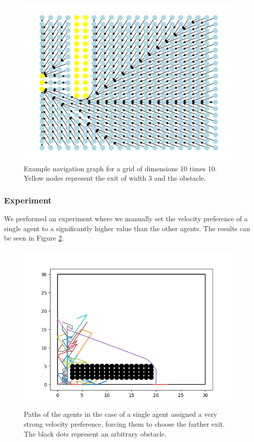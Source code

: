 \documentclass[9pt]{pnas-new}
\begin{document}
\begin{figure}[h!]
    \centering
    \includegraphics[width=0.5\linewidth]{fig/dijkstra.png}
    \caption{Example navigation graph for a grid of dimensions 10 times 10. Yellow nodes represent the exit of width 3 and the obstacle.}
    \label{fig:spgraph}
\end{figure}



\subsubsection{Experiment}
We performed an experiment where we manually set the velocity preference of a single agent to a significantly higher value than the other agents. The results can be seen in Figure \ref{fig:outlier}.
\begin{figure}[htb]
    \centering
    \includegraphics[width=0.5\linewidth]{fig/path_plot_single_outlier.png}
    \caption{Paths of the agents in the case of a single agent assigned a very strong velocity preference, forcing them to choose the farther exit. The black dots represent an arbitrary obstacle.}
    \label{fig:outlier}
\end{figure}
\end{document}
